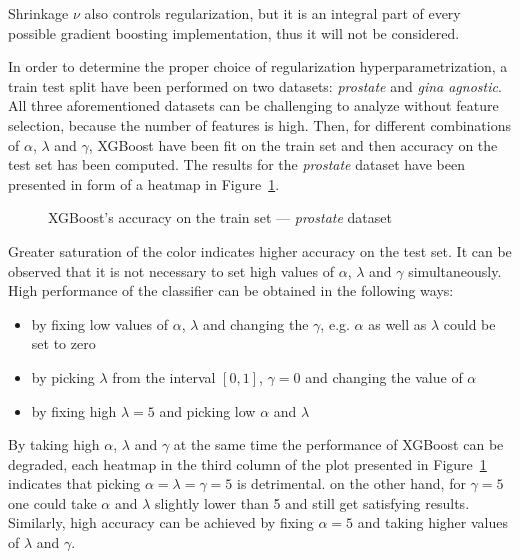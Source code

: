 \documentclass[magisterska, english]{pwr_wmat_praca_dyplomowa}
\theoremstyle{plain}
\numberwithin{theorem}{chapter}
\theoremstyle{definition}
\numberwithin{theorem}{chapter}
\begin{document}
Shrinkage $\nu$ also controls regularization, but it is an integral part of every possible gradient boosting implementation, thus it will not be considered.

In order to determine the proper choice of regularization hyperparametrization, a train test split have been performed on two datasets: \emph{prostate} and \emph{gina agnostic}. All three aforementioned datasets can be challenging to analyze without feature selection, because the number of features is high. Then, for different combinations of $\alpha$, $\lambda$ and $\gamma$, XGBoost have been fit on the train set and then accuracy on the test set has been computed. The results for the \emph{prostate} dataset have been presented in form of a heatmap in Figure~\ref{fig:regularization_prostate}.

\begin{figure}[H]
	\centering
	\caption{XGBoost's accuracy on the train set --- \emph{prostate} dataset}
	\label{fig:regularization_prostate}
\end{figure}

Greater saturation of the color indicates higher accuracy on the test set. It can be observed that it is not necessary to set high values of $\alpha$, $\lambda$ and $\gamma$ simultaneously. High performance of the classifier can be obtained in the following ways:
\begin{itemize}
    \item by fixing low values of $\alpha$, $\lambda$ and changing the $\gamma$, e.g. $\alpha$ as well as $\lambda$ could be set to zero
    \item by picking $\lambda$ from the interval $[0, 1]$, $\gamma=0$ and changing the value of $\alpha$
    \item by fixing high $\lambda=5$ and picking low $\alpha$ and $\lambda$
\end{itemize}

By taking high $\alpha$, $\lambda$ and $\gamma$ at the same time the performance of XGBoost can be degraded, each heatmap in the third column of the plot presented in Figure~\ref{fig:regularization_prostate} indicates that picking $\alpha=\lambda=\gamma=5$ is detrimental. on the other hand, for $\gamma=5$ one could take $\alpha$ and $\lambda$ slightly lower than 5 and still get satisfying results. Similarly, high accuracy can be achieved by fixing $\alpha=5$ and taking higher values of $\lambda$ and $\gamma$.
\end{document}
